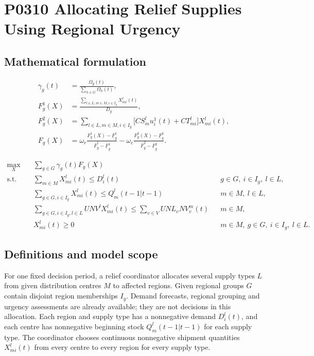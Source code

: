 \documentclass[10pt]{article}
\begin{document}
\section*{P0310 Allocating Relief Supplies Using Regional Urgency}
\subsection*{Mathematical formulation}
\begin{align}
\gamma_g(t)&=\frac{\Omega_g(t)}{\sum_{h\in G}\Omega_h(t)},\\
F_g^1(X)&=\frac{\sum_{l\in L,m\in M,i\in I_g}X_{mi}^l(t)}{D_g},\\
F_g^2(X)&=\sum_{l\in L,m\in M,i\in I_g}
  \bigl[CS_m^l u_i^1(t)+CT_{mi}^l\bigr]X_{mi}^l(t),\\
F_g(X)&=\omega_r\frac{F_g^1(X)-\underline F_g^1}{\overline F_g^1-\underline F_g^1}
-\omega_c\frac{F_g^2(X)-\underline F_g^2}{\overline F_g^2-\underline F_g^2}.
\end{align}

\begin{align}
\max_X\quad &\sum_{g\in G}\gamma_g(t)F_g(X)\tag{20}\\
\text{s.t.}\quad
&\sum_{m\in M}X_{mi}^l(t)\le D_i^l(t)
 &&g\in G,\ i\in I_g,\ l\in L,\tag{22}\\
&\sum_{g\in G,i\in I_g}X_{mi}^l(t)\le Q_m^l(t-1|t-1)
 &&m\in M,\ l\in L,\tag{23}\\
&\sum_{g\in G,i\in I_g,l\in L}UNV^lX_{mi}^l(t)
\le\sum_{v\in V}UNL_vNV_v^m(t) &&m\in M,\tag{24}\\
&X_{mi}^l(t)\ge0 &&m\in M,\ g\in G,\ i\in I_g,\ l\in L.\tag{25}
\end{align}

\subsection*{Definitions and model scope}
For one fixed decision period, a relief coordinator allocates several supply types $L$ from given distribution centres $M$ to affected regions. Given regional groups $G$ contain disjoint region memberships $I_g$. Demand forecasts, regional grouping and urgency assessments are already available; they are not decisions in this allocation. Each region and supply type has a nonnegative demand $D_i^l(t)$, and each centre has nonnegative beginning stock $Q_m^l(t-1|t-1)$ for each supply type. The coordinator chooses continuous nonnegative shipment quantities $X_{mi}^l(t)$ from every centre to every region for every supply type.
\end{document}
